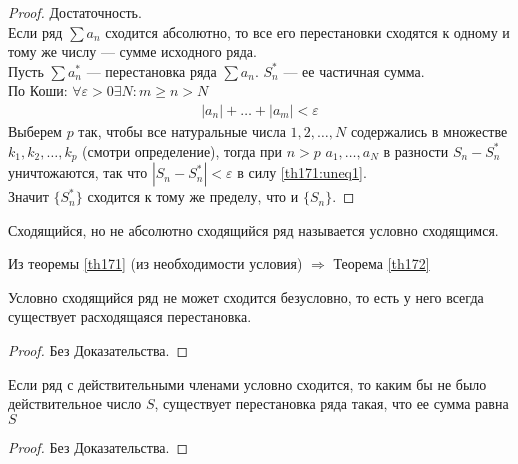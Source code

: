 \begin{proof}
  Достаточность. \\
  Если ряд $\sum a_n$ сходится абсолютно, то все его перестановки сходятся к
  одному и тому же числу --- сумме исходного ряда. \\
  Пусть $\sum a_n^*$ --- перестановка ряда $\sum a_n$. $S_n^*$ --- ее частичная
  сумма. \\
  По Коши: $\forall \varepsilon > 0 \exists N : m \geq n > N$
  \begin{gather}
    |a_n| + \dots + |a_m| < \varepsilon \label{th171:uneq1}
  \end{gather}
  Выберем $p$ так, чтобы все натуральные числа $1, 2, \dots, N$ содержались в
  множестве $k_1, k_2, \dots, k_p$ (смотри определение), тогда при $n > p$
  $a_1, \dots, a_N$ в разности $S_n - S_n^*$ уничтожаются, так что
  $|S_n - S_n^*| < \varepsilon$ в силу \ref{th171:uneq1}. \\
  Значит $\{S_n^*\}$ сходится к тому же пределу, что и $\{S_n\}$.
\end{proof}

\begin{definition}
  Сходящийся, но не абсолютно сходящийся ряд называется условно сходящимся.
\end{definition}
Из теоремы \ref{th171} (из необходимости условия) $\Rightarrow$ Теорема \ref{th172}
\begin{theorem}
  \label{th172}
  Условно сходящийся ряд не может сходится безусловно, то есть у него всегда
  существует расходящаяся перестановка.
\end{theorem}
\begin{proof}
  Без Доказательства.
\end{proof}

\begin{theorem}[Римана]
  Если ряд с действительными членами условно сходится, то каким бы не было
  действительное число $S$, существует перестановка ряда такая, что ее сумма
  равна $S$
\end{theorem}

\begin{proof}
  Без Доказательства.
\end{proof}
